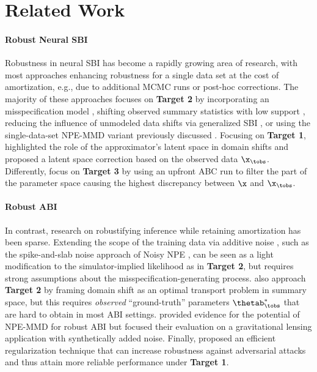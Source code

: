 \section{Related Work}
\label{sec:related_work}

\paragraph{Robust Neural SBI}
Robustness in neural SBI has become a rapidly growing area of research, with most approaches enhancing robustness for a single data set at the cost of amortization, e.g., due to additional MCMC runs or post-hoc corrections.
The majority of these approaches focuses on \textbf{Target 2} by incorporating an misspecification model \citep{ward2022robust}, shifting observed summary statistics with low support \citep{kelly2023misspecification}, reducing the influence of unmodeled data shifts via generalized SBI \citep{gao2023generalized}, or using the single-data-set NPE-MMD variant previously discussed \citep{huang2024learning}.
Focusing on \textbf{Target 1}, \citet{siahkoohi2023reliable} highlighted the role of the approximator's latent space in domain shifts and proposed a latent space correction based on the observed data $\x_\tobs$.
Differently, \citet{wang2024preconditioned} focus on \textbf{Target 3} by using an upfront ABC run to filter the part of the parameter space causing the highest discrepancy between $\x$ and $\x_\tobs$.

\paragraph{Robust ABI} 
In contrast, research on robustifying inference while retaining amortization has been sparse. 
Extending the scope of the training data via additive noise
\citep{cranmer2020frontier, bernaerts2023combined}, such as the spike-and-slab noise approach of Noisy NPE \citep[NNPE;][]{ward2022robust}, can be seen as a light modification to the simulator-implied likelihood as in \textbf{Target 2}, but requires strong assumptions about the misspecification-generating process.
\citet{wehenkel2024addressing} also approach \textbf{Target 2} by framing domain shift as an optimal transport problem in summary space, but this requires \emph{observed} ``ground-truth'' parameters $\thetab_\tobs^*$ that are hard to obtain in most ABI settings.
\citet{swierc2024domain_npe} provided evidence for the potential of NPE-MMD for robust ABI but focused their evaluation on a gravitational lensing application with synthetically added noise.
Finally, \citet{gloeckler2023adversarial} proposed an efficient regularization technique that can increase robustness against adversarial attacks and thus attain more reliable performance under \textbf{Target 1}.
